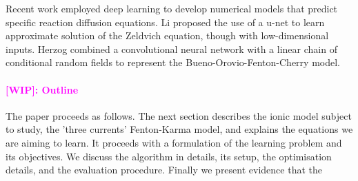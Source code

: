 \documentclass{article}
\newcommand{\WIP}[1]{\textcolor{magenta}{[WIP]: #1}}
\newcommand{\Edu}[1]{\textcolor{magenta}{<Edu>: #1}}
\begin{document}
            
            Recent work employed deep learning to develop numerical models that predict specific reaction diffusion equations.
            Li \cite{li2020reaction} proposed the use of a u-net\cite{ronneberger2015u} to learn approximate solution of the Zeldvich equation\cite{zeldovich1985mathematical}, though with low-dimensional inputs.
            Herzog \cite{herzog2018data} combined a convolutional neural network with a linear chain of conditional random fields to represent the Bueno-Orovio-Fenton-Cherry\cite{bueno2008minimal} model. 
            
        
        \paragraph{\WIP{Outline}}
            The paper proceeds as follows. The next section describes the ionic model subject to study, the 'three currents' Fenton-Karma model, and explains the equations we are aiming to learn. It proceeds with a formulation of the learning problem and its objectives. We discuss the algorithm in details, its setup, the optimisation details, and the evaluation procedure. Finally we present evidence that the 
        
\end{document}
